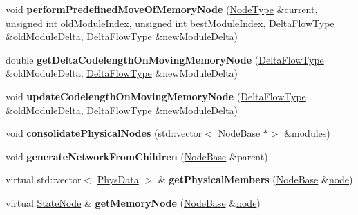 \begin{DoxyCompactItemize}
\item 
\mbox{\label{classInfomapGreedyTypeSpecialized_aefd9508d908cc0099e71a31d6b110b23}} 
void {\bfseries perform\+Predefined\+Move\+Of\+Memory\+Node} (\mbox{\hyperlink{classNode}{Node\+Type}} \&current, unsigned int old\+Module\+Index, unsigned int best\+Module\+Index, \mbox{\hyperlink{structDeltaFlow}{Delta\+Flow\+Type}} \&old\+Module\+Delta, \mbox{\hyperlink{structDeltaFlow}{Delta\+Flow\+Type}} \&new\+Module\+Delta)
\item 
\mbox{\label{classInfomapGreedyTypeSpecialized_a2810fa96206c37d0361866efbca787b1}} 
double {\bfseries get\+Delta\+Codelength\+On\+Moving\+Memory\+Node} (\mbox{\hyperlink{structDeltaFlow}{Delta\+Flow\+Type}} \&old\+Module\+Delta, \mbox{\hyperlink{structDeltaFlow}{Delta\+Flow\+Type}} \&new\+Module\+Delta)
\item 
\mbox{\label{classInfomapGreedyTypeSpecialized_adf1e39020a345fc82fb518c9ef3ccdf9}} 
void {\bfseries update\+Codelength\+On\+Moving\+Memory\+Node} (\mbox{\hyperlink{structDeltaFlow}{Delta\+Flow\+Type}} \&old\+Module\+Delta, \mbox{\hyperlink{structDeltaFlow}{Delta\+Flow\+Type}} \&new\+Module\+Delta)
\item 
\mbox{\label{classInfomapGreedyTypeSpecialized_a30fd1b1be73f77f8bd2797175e09f07b}} 
void {\bfseries consolidate\+Physical\+Nodes} (std\+::vector$<$ \mbox{\hyperlink{classNodeBase}{Node\+Base}} $\ast$$>$ \&modules)
\item 
\mbox{\label{classInfomapGreedyTypeSpecialized_a269cad6d5fe6666109e73664d57b25d5}} 
void {\bfseries generate\+Network\+From\+Children} (\mbox{\hyperlink{classNodeBase}{Node\+Base}} \&parent)
\item 
\mbox{\label{classInfomapGreedyTypeSpecialized_a5c174e0dad9552f2c153849e03b960b4}} 
virtual std\+::vector$<$ \mbox{\hyperlink{structPhysData}{Phys\+Data}} $>$ \& {\bfseries get\+Physical\+Members} (\mbox{\hyperlink{classNodeBase}{Node\+Base}} \&\mbox{\hyperlink{structnode}{node}})
\item 
\mbox{\label{classInfomapGreedyTypeSpecialized_a4d8781ae65bcd0d08fa05c5b2e869868}} 
virtual \mbox{\hyperlink{structStateNode}{State\+Node}} \& {\bfseries get\+Memory\+Node} (\mbox{\hyperlink{classNodeBase}{Node\+Base}} \&\mbox{\hyperlink{structnode}{node}})
\end{DoxyCompactItemize}

